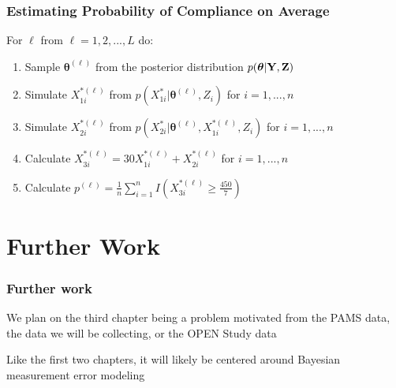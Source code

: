 \documentclass[handout]{beamer}\usepackage[]{graphicx}\usepackage[]{color}
\begin{document}
\begin{frame}
\frametitle{Estimating Probability of Compliance on Average}

For $\ell$ from $\ell=1,2,...,L$ do:
\begin{enumerate}
\item
Sample $\boldsymbol{\theta}^{(\ell)}$ from the posterior distribution $p(\boldsymbol{\theta}|{\bf Y,Z})$
\item
Simulate ${ X_{1i}^{*(\ell)}}$ from $p(X_{1i}^*|\boldsymbol{\theta}^{(\ell)},Z_i)$ for $i=1,...,n$
\item
Simulate ${ X_{2i}^{*(\ell)}}$ from $p(X_{2i}^*|\boldsymbol{\theta}^{(\ell)},X_{1i}^{*(\ell)},Z_i)$ for $i=1,...,n$
\item
Calculate $X_{3i}^{*(\ell)}= 30 X_{1i}^{*(\ell)} + X_{2i}^{*(\ell)}$ for $i=1,...,n$
\item
Calculate $p^{(\ell)} = \frac{1}{n} \sum_{i=1}^{n} I \left( X_{3i}^{*(\ell)} \geq \frac{450}{7} \right) $
\end{enumerate}

\end{frame}

\section{Further Work}
  
\begin{frame}
\frametitle{Further work}

We plan on the third chapter being a problem motivated from the PAMS data, the data we will be collecting, or the OPEN Study data

\vspace{0.8cm}

Like the first two chapters, it will likely be centered around Bayesian measurement error modeling

\end{frame}
\end{document}
